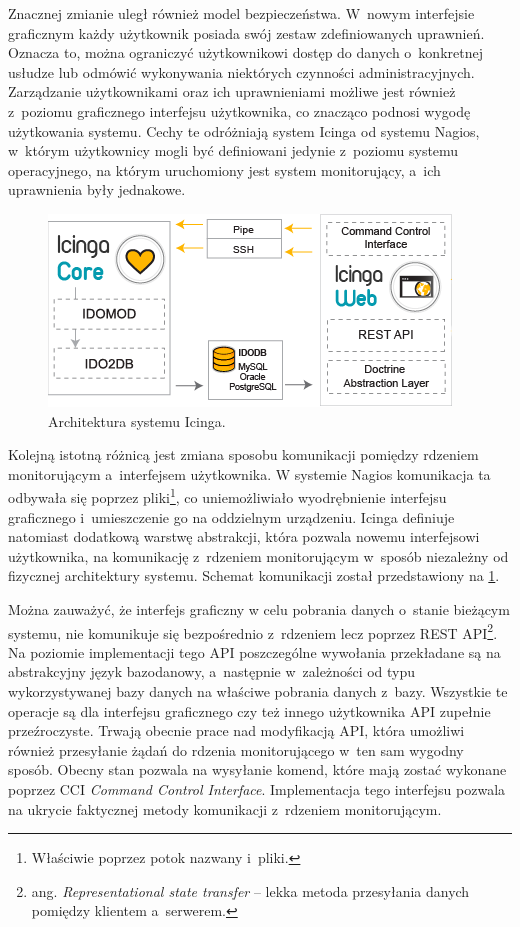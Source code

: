 Znacznej zmianie uległ również model bezpieczeństwa. W~nowym
interfejsie graficznym każdy użytkownik posiada swój zestaw
zdefiniowanych uprawnień. Oznacza to, można ograniczyć użytkownikowi
dostęp do danych o~konkretnej usłudze lub odmówić wykonywania
niektórych czynności administracyjnych. Zarządzanie użytkownikami oraz
ich uprawnieniami możliwe jest również z~poziomu graficznego
interfejsu użytkownika, co znacząco podnosi wygodę użytkowania
systemu. Cechy te odróżniają system Icinga od systemu Nagios, w~którym
użytkownicy mogli być definiowani jedynie z~poziomu systemu
operacyjnego, na którym uruchomiony jest system monitorujący, a~ich
uprawnienia były jednakowe.

\begin{figure}[ht]
  \caption{Architektura systemu Icinga.}
  \label{fig:IcingaOverview}
  \centering
\includegraphics{img/icingaOverview.png}
\end{figure}

Kolejną istotną różnicą jest zmiana sposobu komunikacji pomiędzy
rdzeniem monitorującym a~interfejsem użytkownika. W systemie Nagios
komunikacja ta odbywała się poprzez pliki\footnote{Właściwie poprzez
  potok nazwany i~pliki.}, co uniemożliwiało wyodrębnienie interfejsu
graficznego i~umieszczenie go na oddzielnym urządzeniu. Icinga
definiuje natomiast dodatkową warstwę abstrakcji, która pozwala nowemu
interfejsowi użytkownika, na komunikację z~rdzeniem monitorującym
w~sposób niezależny od fizycznej architektury systemu. Schemat
komunikacji został przedstawiony na \ref{fig:IcingaOverview}.

Można zauważyć, że interfejs graficzny w celu pobrania danych o~stanie
bieżącym systemu, nie komunikuje się bezpośrednio z~rdzeniem lecz
poprzez REST API\footnote{ang. {\em Representational state transfer}
  -- lekka metoda przesyłania danych pomiędzy klientem
  a~serwerem.}. Na poziomie implementacji tego API poszczególne
wywołania przekładane są na abstrakcyjny język bazodanowy, a~następnie
w~zależności od typu wykorzystywanej bazy danych na właściwe pobrania
danych z~bazy. Wszystkie te operacje są dla interfejsu graficznego czy
też innego użytkownika API zupełnie przeźroczyste. Trwają obecnie
prace nad modyfikacją API, która umożliwi również przesyłanie żądań do
rdzenia monitorującego w~ten sam wygodny sposób. Obecny stan pozwala
na wysyłanie komend, które mają zostać wykonane poprzez CCI {\em
  Command Control Interface}. Implementacja tego interfejsu pozwala na
ukrycie faktycznej metody komunikacji z~rdzeniem monitorującym.

